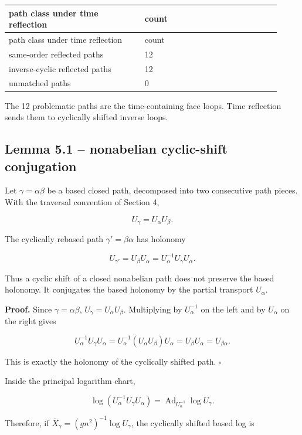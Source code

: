 \documentclass[10pt]{article}
\begin{document}
\begin{center}
\small
\begin{longtable}{|p{0.46\linewidth}|p{0.46\linewidth}|}
\hline
path class under time reflection & count \\
\hline
\endfirsthead
\hline
path class under time reflection & count \\
\hline
\endhead
same-order reflected paths & 12 \\
\hline
inverse-cyclic reflected paths & 12 \\
\hline
unmatched paths & 0 \\
\hline
\end{longtable}
\end{center}

The 12 problematic paths are the time-containing face loops.  Time reflection sends them to cyclically shifted inverse loops.

\subsection{Lemma 5.1 -- nonabelian cyclic-shift conjugation}

Let \(\gamma=\alpha\beta\) be a based closed path, decomposed into two consecutive path pieces.  With the traversal convention of Section 4,

\[
U_\gamma=U_\alpha U_\beta .
\]

The cyclically rebased path \(\gamma'=\beta\alpha\) has holonomy

\[
U_{\gamma'}=U_\beta U_\alpha
=
U_\alpha^{-1}U_\gamma U_\alpha.
\]

Thus a cyclic shift of a closed nonabelian path does not preserve the based holonomy.  It conjugates the based holonomy by the partial transport \(U_\alpha\).

\textbf{Proof.}  Since \(\gamma=\alpha\beta\), \(U_\gamma=U_\alpha U_\beta\).  Multiplying by \(U_\alpha^{-1}\) on the left and by \(U_\alpha\) on the right gives

\[
U_\alpha^{-1}U_\gamma U_\alpha
=
U_\alpha^{-1}(U_\alpha U_\beta)U_\alpha
=
U_\beta U_\alpha
=
U_{\beta\alpha}.
\]

This is exactly the holonomy of the cyclically shifted path.  \(\square\)

Inside the principal logarithm chart,

\[
\log(U_\alpha^{-1}U_\gamma U_\alpha)
=
\operatorname{Ad}_{U_\alpha^{-1}}\log U_\gamma .
\]

Therefore, if \(\bar X_\gamma=(gn^2)^{-1}\log U_\gamma\), the cyclically shifted based log is
\end{document}
